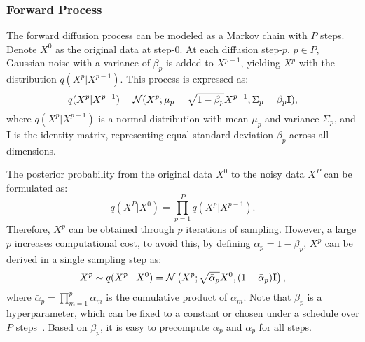 \documentclass[comsoc,journal]{IEEEtran}
\begin{document}
\subsubsection{Forward Process} The forward diffusion process can be modeled as a Markov chain with $P$ steps. Denote $X^{0}$ as the original data at step-$0$. At each diffusion step-$p$, $p \in P$, Gaussian noise with a variance of $\beta_p$ is added to $X^{p-1}$, yielding $X^{p}$ with the distribution $q(X^p|X^{p-1})$. This process is expressed as: 
\begin{equation}\label{eq:q(Xp|X{P-1})}
q(X^p|X^{p-1}) = \mathcal{N}(X^p; \mu_p = \sqrt{1-\beta_p}X^{p-1}, \Sigma_p = \beta_p\mathbf{I}), 
\end{equation} 
where $q(X^p|X^{p-1})$ is a normal distribution with mean $\mu_p$ and variance $\Sigma_p$, and $\mathbf{I}$ is the identity matrix, representing equal standard deviation $\beta_p$ across all dimensions.

The posterior probability from the original data $X^0$ to the noisy data $X^P$ can be formulated as: \begin{equation} \label{eq:q(Xp|X0)}
q(X^P|X^0) = \prod_{p=1}^{P} q(X^p|X^{p-1}). 
\end{equation} 
Therefore, $X^p$ can be obtained through $p$ iterations of sampling. However, a large $p$ increases computational cost, to avoid this, by defining $\alpha_p = 1 - \beta_p$, $X^p$ can be derived in a single sampling step as: 
\begin{equation} \label{eq:p(X{p}|X0} 
{X}^p \sim q(X^p \mid X^0) = \mathcal{N}\left(X^p; \sqrt{\bar{\alpha}_p} X^0, (1 - \bar{\alpha}_p) \mathbf{I}\right), \end{equation} 
where $\bar{\alpha}_p = \prod_{m=1}^{p} \alpha_m$ is the cumulative product of $\alpha_m$. Note that $\beta_p$ is a hyperparameter, which can be fixed to a constant or chosen under a schedule over $P$ steps~\cite{song2020denoising}. Based on $\beta_p$, it is easy to precompute $\alpha_p$ and $\bar{\alpha}_p$ for all steps.
\end{document}
